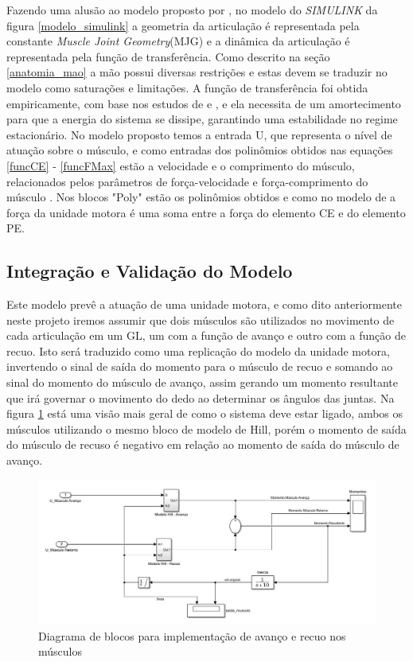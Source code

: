 Fazendo uma alusão ao modelo proposto por \cite{feng1999surface}, no modelo do \textit{SIMULINK} da figura \ref{modelo_simulink} a geometria da articulação é representada pela constante \textit{Muscle Joint Geometry}(MJG) e a dinâmica da articulação é representada pela função de transferência. Como descrito na seção \ref{anatomia_mao} a mão possui diversas restrições e estas devem se traduzir no modelo como saturações e limitações. A função de transferência foi obtida empiricamente, com base nos estudos de \cite{zajac1989muscle} e \cite{rosen1999performances}, e ela necessita de um amortecimento para que a energia do sistema se dissipe, garantindo uma estabilidade no regime estacionário. No modelo proposto temos a entrada U, que representa o nível de atuação sobre o músculo, e como entradas dos polinômios obtidos nas equações \ref{funcCE} - \ref{funcFMax} estão a velocidade e o comprimento do músculo, relacionados pelos parâmetros de força-velocidade e força-comprimento do músculo \cite{zajac1989muscle}. Nos blocos "Poly" estão os polinômios obtidos e como no modelo de \cite{durfee1994estimation} a força da unidade motora é uma soma entre a força do elemento CE e do elemento PE.

\subsection{Integração e Validação do Modelo}
\label{integracao_validacao}
Este modelo prevê a atuação de uma unidade motora, e como dito anteriormente neste projeto iremos assumir que dois músculos são utilizados no movimento de cada articulação em um GL, um com a função de avanço e outro com a função de recuo. Isto será traduzido como uma replicação do modelo da unidade motora, invertendo o sinal de saída do momento para o músculo de recuo e somando ao sinal do momento do músculo de avanço, assim gerando um momento resultante que irá governar o movimento do dedo ao determinar os ângulos das juntas. Na figura \ref{modelo_simulink_macro} está uma visão mais geral de como o sistema deve estar ligado, ambos os músculos utilizando o mesmo bloco de modelo de Hill, porém o momento de saída do músculo de recuso é negativo em relação ao momento de saída do músculo de avanço.

\begin{figure}[H]
\centering
\includegraphics[width = 1\textwidth]{img/Modelo_2Unidades.JPG}
\caption[Modelo de Avanço e Recuo - Simulink]{Diagrama de blocos para implementação de avanço e recuo nos músculos}
\label{modelo_simulink_macro}
\end{figure}

